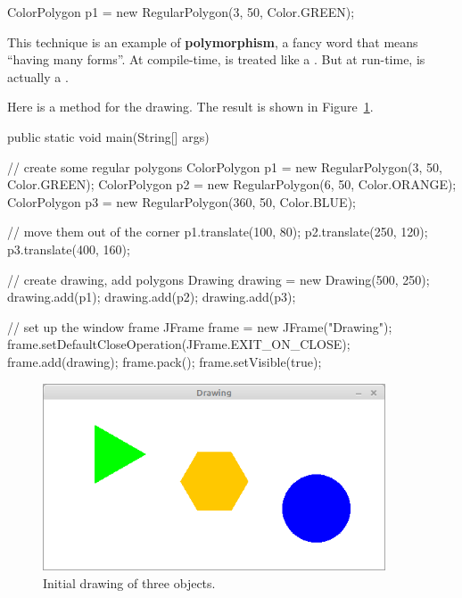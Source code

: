 \begin{code}
ColorPolygon p1 = new RegularPolygon(3, 50, Color.GREEN);
\end{code}


This technique is an example of {\bf polymorphism}, a fancy word that means ``having many forms''.
At compile-time,  is treated like a .
But at run-time,  is actually a .

Here is a  method for the drawing.
The result is shown in Figure~\ref{fig:drawing}.

\begin{code}
public static void main(String[] args) {

    // create some regular polygons
    ColorPolygon p1 = new RegularPolygon(3, 50, Color.GREEN);
    ColorPolygon p2 = new RegularPolygon(6, 50, Color.ORANGE);
    ColorPolygon p3 = new RegularPolygon(360, 50, Color.BLUE);

    // move them out of the corner
    p1.translate(100, 80);
    p2.translate(250, 120);
    p3.translate(400, 160);

    // create drawing, add polygons
    Drawing drawing = new Drawing(500, 250);
    drawing.add(p1);
    drawing.add(p2);
    drawing.add(p3);

    // set up the window frame
    JFrame frame = new JFrame("Drawing");
    frame.setDefaultCloseOperation(JFrame.EXIT_ON_CLOSE);
    frame.add(drawing);
    frame.pack();
    frame.setVisible(true);
}
\end{code}

\begin{figure}[!ht]
\begin{center}
\includegraphics[width=4in]{figs/drawing.png}
\caption{Initial drawing of three  objects.}
\label{fig:drawing}
\end{center}
\end{figure}

